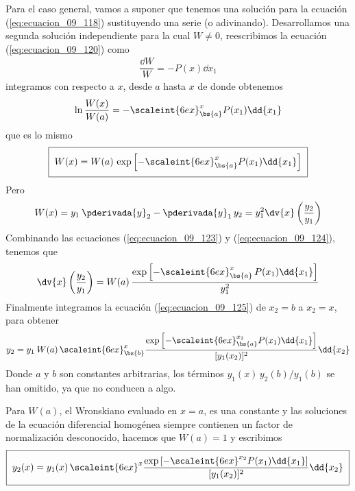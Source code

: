\par
Para el caso general, vamos a suponer que tenemos una solución para la ecuación (\ref{eq:ecuacion_09_118}) sustituyendo una serie (o adivinando). Desarrollamos una segunda solución independiente para la cual $W \neq 0$, reescribimos la ecuación (\ref{eq:ecuacion_09_120}) como
\begin{align*}
\dfrac{\dd{W}}{W} = - P (x) \dd{x_{1}}
\end{align*}
integramos con respecto a $x$, desde $a$ hasta $x$ de donde obtenemos
\begin{align*}
\ln \dfrac{W (x)}{W (a)} = - \scaleint{6ex}_{\bs {a}}^{x} P (x_{1}) \dd{x_{1}}
\end{align*}
que es lo mismo
\begin{align}
\setlength{\fboxsep}{2\fboxsep}\boxed{W (x) = W (a) \, \exp \left[ - \scaleint{6ex}_{\bs {a}}^{x} P (x_{1}) \dd{x_{1}} \right]}
\label{eq:ecuacion_09_123}
\end{align}
Pero
\begin{align}
W (x) = y_{1} \: \pderivada{y}_{2} - \pderivada{y}_{1} \, y_{2} = y_{1}^{2} \dv{x} \left( \dfrac{y_{2}}{y_{1}} \right)
\label{eq:ecuacion_09_124}
\end{align}
Combinando las ecuaciones (\ref{eq:ecuacion_09_123}) y (\ref{eq:ecuacion_09_124}), tenemos que
\begin{align}
\dv{x} \left( \dfrac{y_{2}}{y_{1}} \right) =  W (a) \, \dfrac{\exp \left[\displaystyle - \scaleint{6ex}_{\bs {a}}^{x} \, P (x_{1}) \dd{x_{1}} \right]}{y^{2}_{1}}
\label{eq:ecuacion_09_125}
\end{align}
Finalmente integramos la ecuación (\ref{eq:ecuacion_09_125}) de $x_{2} = b$ a $x_{2} = x$, para obtener
\begin{align}
y_{2} = y_{1} \: W (a) \, \scaleint{6ex}_{\bs {b}}^{x} \dfrac{\exp \left[ \displaystyle - \scaleint{6ex}_{\bs {a}}^{x_{2}} P (x_{1}) \dd{x_{1}} \right]}{[y_{1} (x_{2})]^{2}} \dd{x_{2}}
\label{eq:ecuacion_09_126}
\end{align}
Donde $a$ y $b$ son constantes arbitrarias, los términos $y_{1} (x) \, y_{2} (b)/y_{1} (b)$ se han omitido, ya que no conducen a algo.
\par
Para $W (a)$, el Wronskiano evaluado en $x = a$, es una constante y las soluciones de la ecuación diferencial homogénea siempre contienen un factor de normalización desconocido, hacemos que $W (a) = 1$ y escribimos
\begin{align}
\setlength{\fboxsep}{2\fboxsep}\boxed{y_{2} (x) =  y_{1} (x) \,  \scaleint{6ex}^{x} \dfrac{\exp \left[ \displaystyle - \scaleint{6ex}^{x_{2}} P (x_{1}) \dd{x_{1}} \right]}{[y_{1} (x_{2})]^{2}} \dd{x_{2}}}
\label{eq:ecuacion_09_127}
\end{align}
